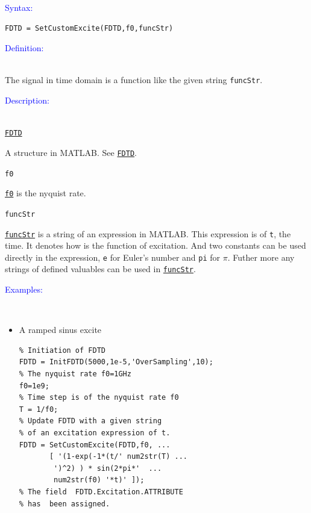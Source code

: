 \textcolor{blue}{\begin{large}Syntax:\end{large}}
 \begin{lstlisting}
FDTD = SetCustomExcite(FDTD,f0,funcStr)
 \end{lstlisting}

\textcolor{blue}{\begin{large}Definition:\end{large}}\\
      The signal in time domain is a function like the given string \texttt{funcStr}.

\textcolor{blue}{\begin{large}Description:\end{large}}\\
	\hyperref[para:FDTD]{\texttt{FDTD}} 
	    \begin{myindentpar}
		A structure in MATLAB. See \hyperref[para:FDTD]{\texttt{FDTD}}.
	    \end{myindentpar}
	\texttt{f0}   \label{para:custom_f0} %
	    \begin{myindentpar}
		\hyperref[para:f0]{\texttt{f0}}  is the nyquist rate. 
	    \end{myindentpar}
	\texttt{funcStr}   \label{para:custom_funcStr} %
	    \begin{myindentpar}
		\hyperref[para:custom_funcStr]{\texttt{funcStr}}   is a string of an expression in MATLAB. This expression is of \texttt{t}, the time. It denotes how is the function of excitation.  And two constants can be used directly in the expression, \texttt{e} for Euler's number and \texttt{pi} for $\pi$. Futher more any strings of defined valuables can be used in \hyperref[para:custom_funcStr]{\texttt{funcStr}}.
	    \end{myindentpar}

	    \textcolor{blue}{\begin{large}Examples:\end{large}}\\
    \begin{itemize}
	\item A ramped sinus excite 
	\begin{lstlisting}
% Initiation of FDTD 
FDTD = InitFDTD(5000,1e-5,'OverSampling',10);
% The nyquist rate f0=1GHz
f0=1e9;
% Time step is of the nyquist rate f0
T = 1/f0;
% Update FDTD with a given string 
% of an excitation expression of t. 
FDTD = SetCustomExcite(FDTD,f0, ...
       [ '(1-exp(-1*(t/' num2str(T) ...
        ')^2) ) * sin(2*pi*'  ...
        num2str(f0) '*t)' ]);
% The field  FDTD.Excitation.ATTRIBUTE 
% has  been assigned.
	\end{lstlisting}
    \end{itemize}

